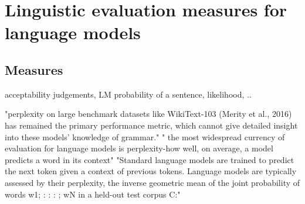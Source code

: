 




\section{Linguistic evaluation measures for language models}



\subsection{Measures}

acceptability judgements, LM probability of a sentence, likelihood, ..

"perplexity on large benchmark datasets like WikiText-103 (Merity et al., 2016) has remained the primary performance metric, which cannot give detailed insight into these models’ knowledge of grammar." \citep{warstadt2020blimp}
" the most widespread currency of evaluation for language models is perplexity-how well, on average, a model predicts a word in its context" \citep{hu2020systematic}
"Standard language models are trained to predict the next token given a context of previous tokens. Language models are typically assessed by their perplexity, the inverse geometric mean of the joint probability of words w1; : : : ; wN in a held-out test corpus C:" \citep{hu2020systematic}

